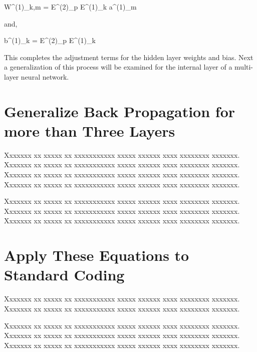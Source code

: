 \documentclass{article}
\newcommand{\VAR}[3]{#1^{(#2)}_{#3}}
\begin{document}
\begin{tcequation}
  \Delta \VAR{W}{1}{k,m} = \VAR{E}{2}{p} \VAR{E}{1}{k} \VAR{a}{1}{m}
  \label{eq:delW1}
\end{tcequation}

and,

\begin{tcequation}
  \Delta \VAR{b}{1}{k} = \VAR{E}{2}{p} \VAR{E}{1}{k}
  \label{eq:delb1}
\end{tcequation}

This completes the adjustment terms for the hidden layer weights and
bias.  Next a generalization of this process will be examined for the
internal layer of a multi-layer neural network.

\section{Generalize Back Propagation for more than Three Layers}

Xxxxxxx xx xxxxx xx xxxxxxxxxxx xxxxx xxxxxx xxxx xxxxxxxx xxxxxxx.
Xxxxxxx xx xxxxx xx xxxxxxxxxxx xxxxx xxxxxx xxxx xxxxxxxx xxxxxxx.
Xxxxxxx xx xxxxx xx xxxxxxxxxxx xxxxx xxxxxx xxxx xxxxxxxx xxxxxxx.
Xxxxxxx xx xxxxx xx xxxxxxxxxxx xxxxx xxxxxx xxxx xxxxxxxx xxxxxxx.

Xxxxxxx xx xxxxx xx xxxxxxxxxxx xxxxx xxxxxx xxxx xxxxxxxx xxxxxxx.
Xxxxxxx xx xxxxx xx xxxxxxxxxxx xxxxx xxxxxx xxxx xxxxxxxx xxxxxxx.
Xxxxxxx xx xxxxx xx xxxxxxxxxxx xxxxx xxxxxx xxxx xxxxxxxx xxxxxxx.

\section{Apply These Equations to Standard Coding}

Xxxxxxx xx xxxxx xx xxxxxxxxxxx xxxxx xxxxxx xxxx xxxxxxxx xxxxxxx.
Xxxxxxx xx xxxxx xx xxxxxxxxxxx xxxxx xxxxxx xxxx xxxxxxxx xxxxxxx.

Xxxxxxx xx xxxxx xx xxxxxxxxxxx xxxxx xxxxxx xxxx xxxxxxxx xxxxxxx.
Xxxxxxx xx xxxxx xx xxxxxxxxxxx xxxxx xxxxxx xxxx xxxxxxxx xxxxxxx.
Xxxxxxx xx xxxxx xx xxxxxxxxxxx xxxxx xxxxxx xxxx xxxxxxxx xxxxxxx.
\end{document}
